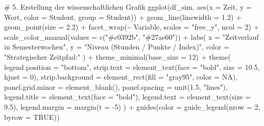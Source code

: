 \documentclass[
  ngerman,
  letterpaper,
  DIV=11]{scrartcl}
\newenvironment{Shaded}{\begin{snugshade}}{\end{snugshade}}
\newcommand{\AttributeTok}[1]{\textcolor[rgb]{0.40,0.45,0.13}{#1}}
\newcommand{\CommentTok}[1]{\textcolor[rgb]{0.37,0.37,0.37}{#1}}
\newcommand{\ConstantTok}[1]{\textcolor[rgb]{0.56,0.35,0.01}{#1}}
\newcommand{\DecValTok}[1]{\textcolor[rgb]{0.68,0.00,0.00}{#1}}
\newcommand{\FloatTok}[1]{\textcolor[rgb]{0.68,0.00,0.00}{#1}}
\newcommand{\FunctionTok}[1]{\textcolor[rgb]{0.28,0.35,0.67}{#1}}
\newcommand{\NormalTok}[1]{\textcolor[rgb]{0.00,0.23,0.31}{#1}}
\newcommand{\SpecialCharTok}[1]{\textcolor[rgb]{0.37,0.37,0.37}{#1}}
\newcommand{\StringTok}[1]{\textcolor[rgb]{0.13,0.47,0.30}{#1}}
\begin{document}
\begin{Shaded}
\begin{Highlighting}[]
\CommentTok{\# 5. Erstellung der wissenschaftlichen Grafik}
\FunctionTok{ggplot}\NormalTok{(df\_sim, }\FunctionTok{aes}\NormalTok{(}\AttributeTok{x =}\NormalTok{ Zeit, }\AttributeTok{y =}\NormalTok{ Wert, }\AttributeTok{color =}\NormalTok{ Student, }\AttributeTok{group =}\NormalTok{ Student)) }\SpecialCharTok{+}
  \FunctionTok{geom\_line}\NormalTok{(}\AttributeTok{linewidth =} \FloatTok{1.2}\NormalTok{) }\SpecialCharTok{+}
  \FunctionTok{geom\_point}\NormalTok{(}\AttributeTok{size =} \FloatTok{2.2}\NormalTok{) }\SpecialCharTok{+}
  \FunctionTok{facet\_wrap}\NormalTok{(}\SpecialCharTok{\textasciitilde{}}\NormalTok{ Variable, }\AttributeTok{scales =} \StringTok{"free\_y"}\NormalTok{, }\AttributeTok{ncol =} \DecValTok{2}\NormalTok{) }\SpecialCharTok{+}
  \FunctionTok{scale\_color\_manual}\NormalTok{(}\AttributeTok{values =} \FunctionTok{c}\NormalTok{(}\StringTok{"\#c0392b"}\NormalTok{, }\StringTok{"\#27ae60"}\NormalTok{)) }\SpecialCharTok{+}
  \FunctionTok{labs}\NormalTok{(}
    \AttributeTok{x =} \StringTok{"Zeitverlauf in Semesterwochen"}\NormalTok{,}
    \AttributeTok{y =} \StringTok{"Niveau (Stunden / Punkte / Index)"}\NormalTok{,}
    \AttributeTok{color =} \StringTok{"Strategischer Zeitpfad:"}
\NormalTok{  ) }\SpecialCharTok{+}
  \FunctionTok{theme\_minimal}\NormalTok{(}\AttributeTok{base\_size =} \DecValTok{12}\NormalTok{) }\SpecialCharTok{+}
  \FunctionTok{theme}\NormalTok{(}
    \AttributeTok{legend.position =} \StringTok{"bottom"}\NormalTok{,}
    \AttributeTok{strip.text =} \FunctionTok{element\_text}\NormalTok{(}\AttributeTok{face =} \StringTok{"bold"}\NormalTok{, }\AttributeTok{size =} \FloatTok{10.5}\NormalTok{, }\AttributeTok{hjust =} \DecValTok{0}\NormalTok{),}
    \AttributeTok{strip.background =} \FunctionTok{element\_rect}\NormalTok{(}\AttributeTok{fill =} \StringTok{"gray95"}\NormalTok{, }\AttributeTok{color =} \ConstantTok{NA}\NormalTok{),}
    \AttributeTok{panel.grid.minor =} \FunctionTok{element\_blank}\NormalTok{(),}
    \AttributeTok{panel.spacing =} \FunctionTok{unit}\NormalTok{(}\FloatTok{1.5}\NormalTok{, }\StringTok{"lines"}\NormalTok{),}
    \AttributeTok{legend.title =} \FunctionTok{element\_text}\NormalTok{(}\AttributeTok{face =} \StringTok{"bold"}\NormalTok{),}
    \AttributeTok{legend.text =} \FunctionTok{element\_text}\NormalTok{(}\AttributeTok{size =} \FloatTok{9.5}\NormalTok{),}
    \AttributeTok{legend.margin =} \FunctionTok{margin}\NormalTok{(}\AttributeTok{t =} \SpecialCharTok{{-}}\DecValTok{5}\NormalTok{)}
\NormalTok{  ) }\SpecialCharTok{+}
  \FunctionTok{guides}\NormalTok{(}\AttributeTok{color =} \FunctionTok{guide\_legend}\NormalTok{(}\AttributeTok{nrow =} \DecValTok{2}\NormalTok{, }\AttributeTok{byrow =} \ConstantTok{TRUE}\NormalTok{))}
\end{Highlighting}
\end{Shaded}
\end{document}
